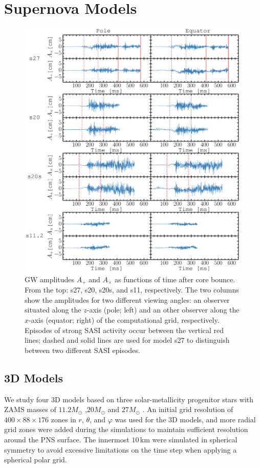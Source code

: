 \section{Supernova Models}
\label{sec:numerics}

\begin{figure}
\centering
\includegraphics[width=0.99\textwidth]{./images/paper1/fig1.pdf}
\caption{GW amplitudes $A_+$ and $A_\times$ as functions of time
  after core bounce.
  From the top: s27, s20, s20s, and s11, respectively. 
  The two columns show the amplitudes for two different viewing angles: an observer
  situated along the $z$-axis (pole; left) and an other observer along the $x$-axis (equator; right) of the computational grid, respectively.
  Episodes of strong SASI activity occur between the vertical red lines; dashed and solid lines are used for
  model s27 to distinguish between two different SASI episodes.
\label{fig:amps}}
\end{figure}
\subsection{\comment 3D  Models}
We study four 3D models based on three solar-metallicity progenitor stars with ZAMS masses of $11.2 M_\odot$ \citep{woosley_02},$20 M_\odot$ \citep{woosley_07} and $27 M_\odot$ \citep{woosley_02}. 
{An initial grid resolution of $400\times 88 \times 176$ zones in $r$, $\theta$, and $\varphi$ was used for the 3D models, and more radial grid zones were added
during the simulations to maintain sufficient resolution around the PNS surface.}
{The innermost $10 \, \mathrm{km}$ were simulated in spherical symmetry to avoid
excessive limitations on the time step when applying a spherical polar grid.}

